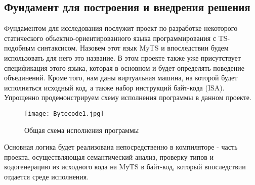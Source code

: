 \subsection{Фундамент для построения и внедрения решения}

Фундаментом для исследования послужит проект по разработке некоторого статического объектно-ориентированного языка
программирования с TS-подобным синтаксисом.
Назовем этот язык MyTS и впоследствии будем использовать для него это название.
В этом проекте также уже присутствует спецификация этого языка, которая в основном и будет определять поведение
объединений.
Кроме того, нам даны виртуальная машина, на которой будет исполняться исходный код, а также набор инструкций байт-кода (ISA).
Упрощенно продемонстрируем схему исполнения программы в данном проекте.

\begin{figure}[h]
    \centering
    \texttt{[image: Bytecode1.jpg]}
    \caption{Общая схема исполнения программы}\label{fig:figure}
\end{figure}

Основная логика будет реализована непосредственно в компиляторе - часть проекта, осуществляющая семантический анализ,
проверку типов и кодогенерацию из исходного кода на MyTS в байт-код, который впоследствии отдается среде исполнения.

\newpage
